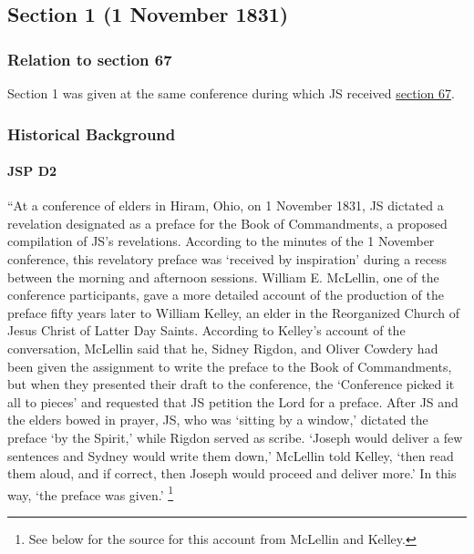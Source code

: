 \subsection{Section 1 (1 November 1831)}
	\label{DC1}
	
	\subsubsection{Relation to section 67}
	
		Section 1 was given at the same conference during which JS received \hyperref[DC67]{section 67}.
	
	\subsubsection{Historical Background}
		\label{DC1-HB}
		
		\paragraph{JSP D2}
		
			``At a conference of elders in Hiram, Ohio, on 1 November 1831, JS dictated a revelation designated as a preface for the Book of Commandments, a proposed compilation of JS's revelations. According to the minutes of the 1 November conference, this revelatory preface was `received by inspiration' during a recess between the morning and afternoon sessions. William E. McLellin, one of the conference participants, gave a more detailed account of the production of the preface fifty years later to William Kelley, an elder in the Reorganized Church of Jesus Christ of Latter Day Saints. According to Kelley's account of the conversation, McLellin said that he, Sidney Rigdon, and Oliver Cowdery had been given the assignment to write the preface to the Book of Commandments, but when they presented their draft to the conference, the `Conference picked it all to pieces' and requested that JS petition the Lord for a preface. After JS and the elders bowed in prayer, JS, who was `sitting by a window,' dictated the preface `by the Spirit,' while Rigdon served as scribe. `Joseph would deliver a few sentences and Sydney would write them down,' McLellin told Kelley, `then read them aloud, and if correct, then Joseph would proceed and deliver more.' In this way, `the preface was given.'%
				\footnote{%
					See below for the source for this account from McLellin and Kelley.
					}
			
